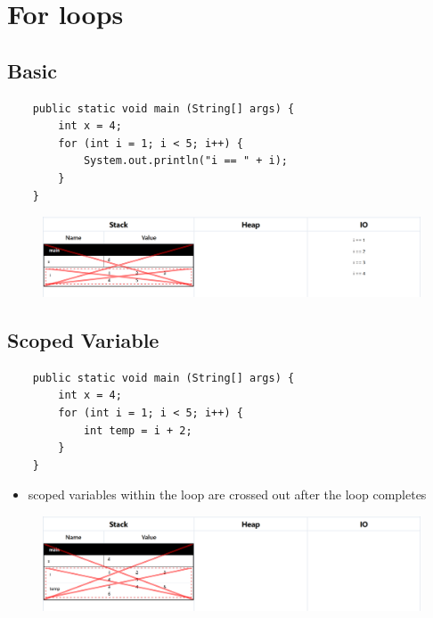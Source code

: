 \documentclass{article}
\begin{document}
\pagebreak

\section{For loops}

\subsection{Basic}

\begin{verbatim}
	public static void main (String[] args) {
	    int x = 4;
	    for (int i = 1; i < 5; i++) {
	        System.out.println("i == " + i);
	    }
	}
\end{verbatim}

\begin{figure}[H]
	\centering
	\includegraphics{forBasic.png}
\end{figure}

\subsection{Scoped Variable}

\begin{verbatim}
	public static void main (String[] args) {
	    int x = 4;
	    for (int i = 1; i < 5; i++) {
	        int temp = i + 2;
	    }
	}
\end{verbatim}

\begin{itemize}
	\item scoped variables within the loop are crossed out after the loop completes
\end{itemize}

\begin{figure}[H]
	\centering
	\includegraphics{forScoped.png}
\end{figure}
\end{document}
